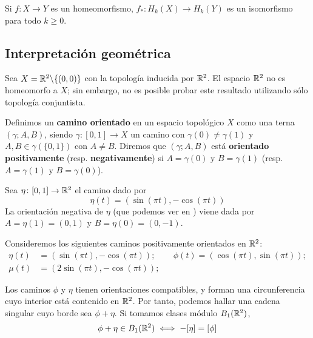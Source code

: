 \begin{theorem}
	Si $f\colon X \to Y$ es un homeomorfismo, $f_*\colon H_k(X) \to H_k(Y)$ es un isomorfismo para todo $k \geq 0$.
\end{theorem}

\subsection{Interpretación geométrica}
Sea $X=\mathbb{R}^2\backslash\{(0,0)\}$ con la topología inducida por $\mathbb{R}^2$.
El espacio $\mathbb{R}^2$ no es homeomorfo a $X$; sin embargo, no es posible probar este resultado utilizando sólo topología conjuntista.

Definimos un \textbf{camino orientado} en un espacio topológico $X$ como una terna $(\gamma; A,B)$, siendo $\gamma\colon [0,1] \to X$ un camino con $\gamma(0)\neq \gamma(1)$ y $A,B \in \gamma(\{0,1\})$ con $A\neq B$.
Diremos que $(\gamma; A,B)$ está \textbf{orientado positivamente} (resp. \textbf{negativamente}) si $A=\gamma(0)$ y $B=\gamma(1)$ (resp. $A=\gamma(1)$ y $B=\gamma(0)$).

\begin{example}
Sea $\eta\colon [0,1] \to \mathbb{R}^2$ el camino dado por
	\[\eta(t)=(\sin(\pi t),-\cos(\pi t))\]
La orientación negativa de $\eta$ (que podemos ver en ) viene dada por $A=\eta(1)=(0,1)$ y $B=\eta(0)=(0,-1)$.
\end{example}


Consideremos los siguientes caminos positivamente orientados en $\mathbb{R}^2$:
\begin{align*}
	\eta(t)	&=(\sin(\pi t),-\cos(\pi t)); &&\phi(t)=(\cos(\pi t),\sin(\pi t));\\
	\mu(t)	&=(2\sin(\pi t),-\cos(\pi t));
\end{align*}

Los caminos $\phi$ y $\eta$ tienen orientaciones compatibles, y forman una circunferencia cuyo interior está contenido en $\mathbb{R}^2$.
Por tanto, podemos hallar una cadena singular cuyo borde sea $\phi+\eta$.
Si tomamos clases módulo $B_1(\mathbb{R}^2)$,
	\[\phi+\eta \in B_1(\mathbb{R}^2) \iff -[\eta]=[\phi]\]


